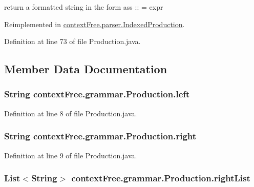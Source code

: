 return a formatted string in the form ass \-:\-: = expr 



Reimplemented in \hyperlink{classcontext_free_1_1parser_1_1_indexed_production_a061cd84bd37e6111edcd52bcb5b9c749}{context\-Free.\-parser.\-Indexed\-Production}.



Definition at line 73 of file Production.\-java.



\subsection{Member Data Documentation}
\hypertarget{classcontext_free_1_1grammar_1_1_production_ad188a705cd57d55d32fd198e6af71f75}{
\subsubsection[{left}]{\setlength{\rightskip}{0pt plus 5cm}String {\bf context\-Free.\-grammar.\-Production.\-left}}}\label{classcontext_free_1_1grammar_1_1_production_ad188a705cd57d55d32fd198e6af71f75}


Definition at line 8 of file Production.\-java.

\hypertarget{classcontext_free_1_1grammar_1_1_production_ab72c30da44fb1fbf41b9a70bf799ef58}{
\subsubsection[{right}]{\setlength{\rightskip}{0pt plus 5cm}String {\bf context\-Free.\-grammar.\-Production.\-right}}}\label{classcontext_free_1_1grammar_1_1_production_ab72c30da44fb1fbf41b9a70bf799ef58}


Definition at line 9 of file Production.\-java.

\hypertarget{classcontext_free_1_1grammar_1_1_production_a51394e602f57b3e2f9b07d14fd01adb9}{
\subsubsection[{right\-List}]{\setlength{\rightskip}{0pt plus 5cm}List$<$String$>$ {\bf context\-Free.\-grammar.\-Production.\-right\-List}}}\label{classcontext_free_1_1grammar_1_1_production_a51394e602f57b3e2f9b07d14fd01adb9}


